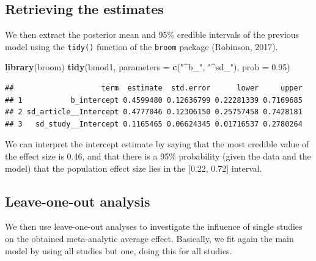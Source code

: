 \documentclass[floatsintext,doc]{apa6}
\newenvironment{Shaded}{\begin{snugshade}}{\end{snugshade}}
\newcommand{\DataTypeTok}[1]{\textcolor[rgb]{0.13,0.29,0.53}{#1}}
\newcommand{\FloatTok}[1]{\textcolor[rgb]{0.00,0.00,0.81}{#1}}
\newcommand{\KeywordTok}[1]{\textcolor[rgb]{0.13,0.29,0.53}{\textbf{#1}}}
\newcommand{\NormalTok}[1]{#1}
\newcommand{\StringTok}[1]{\textcolor[rgb]{0.31,0.60,0.02}{#1}}
\begin{document}
\hypertarget{retrieving-the-estimates}{%
\subsection{Retrieving the estimates}\label{retrieving-the-estimates}}

We then extract the posterior mean and 95\% credible intervals of the previous model using the \texttt{tidy()} function of the \texttt{broom} package (Robinson, 2017).

\begin{Shaded}
\begin{Highlighting}[]
\KeywordTok{library}\NormalTok{(broom)}
\KeywordTok{tidy}\NormalTok{(bmod1, }\DataTypeTok{parameters =} \KeywordTok{c}\NormalTok{(}\StringTok{"^b_"}\NormalTok{, }\StringTok{"^sd_"}\NormalTok{), }\DataTypeTok{prob =} \FloatTok{0.95}\NormalTok{)}
\end{Highlighting}
\end{Shaded}

\begin{verbatim}
##                    term  estimate  std.error      lower     upper
## 1           b_intercept 0.4599480 0.12636799 0.22281339 0.7169685
## 2 sd_article__Intercept 0.4777046 0.12306150 0.25757458 0.7428181
## 3   sd_study__Intercept 0.1165465 0.06624345 0.01716537 0.2780264
\end{verbatim}

We can interpret the intercept estimate by saying that the most credible value of the effect size is 0.46, and that there is a 95\% probability (given the data and the model) that the population effect size lies in the {[}0.22, 0.72{]} interval.

\hypertarget{leave-one-out-analysis}{%
\subsection{Leave-one-out analysis}\label{leave-one-out-analysis}}

We then use leave-one-out analyses to investigate the influence of single studies on the obtained meta-analytic average effect. Basically, we fit again the main model by using all studies but one, doing this for all studies.
\end{document}
